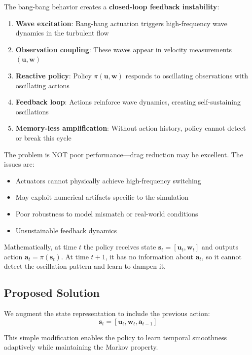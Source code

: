 \documentclass[11pt,a4paper]{article}
\theoremstyle{definition}
\begin{document}
The bang-bang behavior creates a \textbf{closed-loop feedback instability}:

\begin{enumerate}
    \item \textbf{Wave excitation}: Bang-bang actuation triggers high-frequency wave dynamics in the turbulent flow
    \item \textbf{Observation coupling}: These waves appear in velocity measurements $(\mathbf{u}, \mathbf{w})$
    \item \textbf{Reactive policy}: Policy $\pi(\mathbf{u}, \mathbf{w})$ responds to oscillating observations with oscillating actions
    \item \textbf{Feedback loop}: Actions reinforce wave dynamics, creating self-sustaining oscillations
    \item \textbf{Memory-less amplification}: Without action history, policy cannot detect or break this cycle
\end{enumerate}

The problem is NOT poor performance---drag reduction may be excellent. The issues are:
\begin{itemize}
    \item Actuators cannot physically achieve high-frequency switching
    \item May exploit numerical artifacts specific to the simulation
    \item Poor robustness to model mismatch or real-world conditions
    \item Unsustainable feedback dynamics
\end{itemize}

Mathematically, at time $t$ the policy receives state $\mathbf{s}_t = [\mathbf{u}_t, \mathbf{w}_t]$ and outputs action $\mathbf{a}_t = \pi(\mathbf{s}_t)$. At time $t+1$, it has no information about $\mathbf{a}_t$, so it cannot detect the oscillation pattern and learn to dampen it.

\subsection{Proposed Solution}

We augment the state representation to include the previous action:
\begin{equation}
    \mathbf{s}_t = [\mathbf{u}_t, \mathbf{w}_t, \mathbf{a}_{t-1}]
\end{equation}

This simple modification enables the policy to learn temporal smoothness adaptively while maintaining the Markov property.
\end{document}
